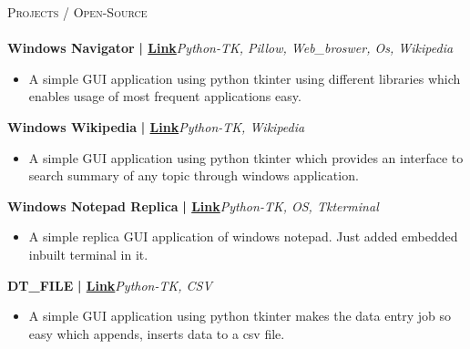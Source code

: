 \documentclass[a4paper]{article}
\newcommand{\lineunder} {
    \vspace*{-8pt} \\
    \hspace*{-18pt} \hrulefill \\
}
\newcommand{\header} [1] {
    {\hspace*{-18pt}\vspace*{6pt} \textsc{#1}}
    \vspace*{-6pt} \lineunder
}
\begin{document}
      \header{Projects / Open-Source}
      \vspace{2mm}
      {\textbf{Windows Navigator}}\textbf{ | \href{https://github.com/DarshanDEV1/WindowsNavigator}{Link}}\hfill{\sl Python-TK, Pillow, Web\_broswer, Os, Wikipedia}\\
          \vspace{-3mm}
\begin{itemize} \itemsep -3pt
\item[] A simple GUI application using python tkinter using different libraries which enables usage of most frequent applications easy.
\end{itemize}
          \vspace*{3mm}
      {\textbf{Windows Wikipedia}}\textbf{ | \href{https://github.com/DarshanDEV1/DT\_Wiki}{Link}}\hfill{\sl Python-TK, Wikipedia}\\
          \vspace{-3mm}
\begin{itemize} \itemsep -3pt
\item[] A simple GUI application using python tkinter which provides an interface to search summary of any topic through windows application.
\end{itemize}
          \vspace*{3mm}
      {\textbf{Windows Notepad Replica}}\textbf{ | \href{https://github.com/DarshanDEV1/DT\_Notepad}{Link}}\hfill{\sl Python-TK, OS, Tkterminal}\\
          \vspace{-3mm}
\begin{itemize} \itemsep -3pt
\item[] A simple replica GUI application of windows notepad. Just added embedded inbuilt terminal in it.
\end{itemize}
          \vspace*{3mm}
      {\textbf{DT\_FILE}}\textbf{ | \href{https://github.com/DarshanDEV1/DT\_FILE}{Link}}\hfill{\sl Python-TK, CSV}\\
          \vspace{-3mm}
\begin{itemize} \itemsep -3pt
\item[] A simple GUI application using python tkinter makes the data entry job so easy which appends, inserts data to a csv file.
\end{itemize}
          \vspace*{3mm}
\end{document}
